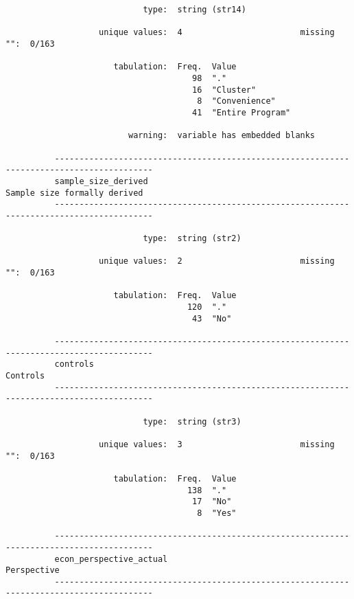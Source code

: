 \documentclass{article}
\begin{document}
\begin{verbatim}
                            type:  string (str14)
          
                   unique values:  4                        missing "":  0/163
          
                      tabulation:  Freq.  Value
                                      98  "."
                                      16  "Cluster"
                                       8  "Convenience"
                                      41  "Entire Program"
          
                         warning:  variable has embedded blanks
          
          ------------------------------------------------------------------------------------------
          sample_size_derived                                           Sample size formally derived
          ------------------------------------------------------------------------------------------
          
                            type:  string (str2)
          
                   unique values:  2                        missing "":  0/163
          
                      tabulation:  Freq.  Value
                                     120  "."
                                      43  "No"
          
          ------------------------------------------------------------------------------------------
          controls                                                                          Controls
          ------------------------------------------------------------------------------------------
          
                            type:  string (str3)
          
                   unique values:  3                        missing "":  0/163
          
                      tabulation:  Freq.  Value
                                     138  "."
                                      17  "No"
                                       8  "Yes"
          
          ------------------------------------------------------------------------------------------
          econ_perspective_actual                                                        Perspective
          ------------------------------------------------------------------------------------------
          

\end{verbatim}
\end{document}
